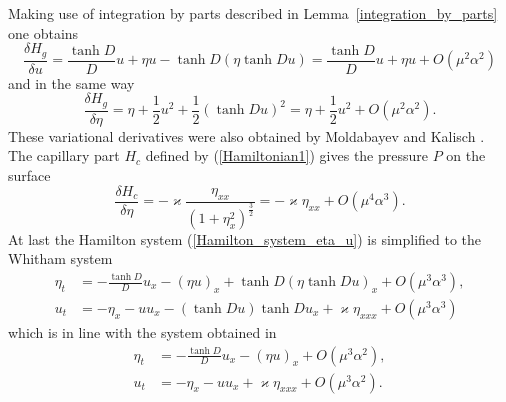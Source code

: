 %
Making use of integration by parts described in
Lemma~{\ref{integration_by_parts}} one obtains
%
\[
	\frac{\delta H_g}{\delta u}
	=
	\frac{\tanh D}{D} u + \eta u - \tanh{D} (\eta \tanh{D} u)
	=
	\frac{\tanh D}{D} u + \eta u + O(\mu^2 \alpha^2)
\]
%
and in the same way
%
\[
	\frac{\delta H_g}{\delta \eta}
	=
	\eta + \frac 12 u^2 + \frac 12 (\tanh{D} u)^2
	=
	\eta + \frac 12 u^2 + O(\mu^2 \alpha^2)
	.
\]
%
These variational derivatives were also obtained by Moldabayev and Kalisch
\cite{Moldabayev2015}.
The capillary part $H_c$ defined by (\ref{Hamiltonian1})
gives the pressure $P$ on the surface
%
\[
	\frac{\delta H_c}{\delta \eta}
	=
	- \varkappa \frac{ \eta_{xx} }{ ( 1 + \eta_x^2 )^{\frac 32} }	
	=
	- \varkappa \eta_{xx} + O(\mu^4 \alpha^3)
	.
\]
%
At last the Hamilton system (\ref{Hamilton_system_eta_u})
is simplified to the Whitham system
%
\begin{align}
\label{sys1}
	\eta_t &=
	- \frac{\tanh D}{D} u_x - (\eta u)_x +
	\tanh{D} (\eta \tanh{D} u)_x + O(\mu^3 \alpha^3)
	, \\
\label{sys2}
	u_t &=
	- \eta_x - u u_x - (\tanh{D} u) \tanh{D} u_x
	+ \varkappa \eta_{xxx} + O(\mu^3 \alpha^3)
\end{align}
%
which is in line with the system obtained in \cite{Moldabayev2015}
%
\begin{align*}
	\eta_t &=
	- \frac{\tanh D}{D} u_x - (\eta u)_x + O(\mu^3 \alpha^2)
	, \\
	u_t &=
	- \eta_x - u u_x + \varkappa \eta_{xxx} + O(\mu^3 \alpha^2)
	.
\end{align*}
%
%
%
